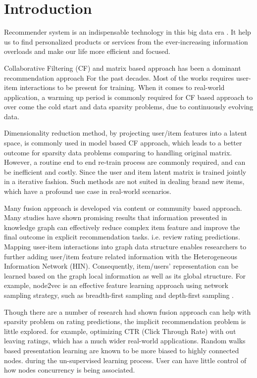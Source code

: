 \section{Introduction}

Recommender system is an indispensable technology in this big data era \cite{lu2015recommender}. It help us to find personalized products or services from the ever-increasing information overloads and make our life more efficient and focused.

Collaborative Filtering (CF) and matrix based approach has been a dominant recommendation approach For the past decades. Most of the works requires user-item interactions to be present for training. When it comes to real-world application, a warming up period is commonly required for CF based approach to over come the cold start and data sparsity problems, due to continuously evolving data.

Dimensionality reduction method, by projecting user/item features into a latent space, is commonly used in model based CF approach, which leads to a better outcome for sparsity data problems comparing to handling original matrix. However, a routine end to end re-train process are commonly required, and can be inefficient and costly. Since the user and item latent matrix is trained jointly in a iterative fashion. Such methods are not suited in dealing brand new items, which have a profound use case in real-world scenarios. 

Many fusion approach is developed via content or community based approach. \cite{wang2016member} Many studies have shown promising results that information presented in knowledge graph can effectively reduce complex item feature and improve the final outcome in explicit recommendation tasks. i.e. review rating predictions. \cite{hu2018leveraging} \cite{mao2016multirelational} Mapping user-item interactions into graph data structure enables researchers to further adding user/item feature related information with the Heterogeneous Information Network (HIN). Consequently, item/users' representation can be learned based on the graph local information as well as its global structure. For example, node2vec \cite{grover2016node2vec} is an effective feature learning approach using network sampling strategy, such as breadth-first sampling and depth-first sampling . 

Though there are a number of research had shown fusion approach can help with sparsity problem on rating predictions, the implicit recommendation problem is little explored. for example, optimizing CTR (Click Through Rate) with out leaving ratings, which has a much wider real-world applications. Random walks based presentation learning are known to be more biased to highly connected nodes. \cite{sun2011pathsim} during the un-supervised learning process. User can have little control of how nodes concurrency is being associated. 

